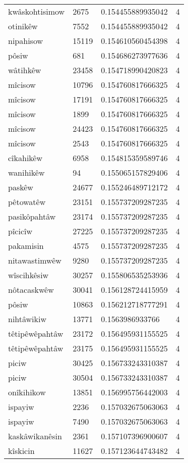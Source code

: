 \begin{longtable}{llll}
kwâskohtisimow & 2675 & 0.154455889935042 & 4 \\
otinikêw & 7552 & 0.154455889935042 & 4 \\
nipahisow & 15119 & 0.154610560454398 & 4 \\
pôsiw & 681 & 0.154686273977636 & 4 \\
wâtihkêw & 23458 & 0.154718990420823 & 4 \\
mîcisow & 10796 & 0.154760817666325 & 4 \\
mîcisow & 17191 & 0.154760817666325 & 4 \\
mîcisow & 1899 & 0.154760817666325 & 4 \\
mîcisow & 24423 & 0.154760817666325 & 4 \\
mîcisow & 2543 & 0.154760817666325 & 4 \\
cîkahikêw & 6958 & 0.154815359589746 & 4 \\
wanihikêw & 94 & 0.155065157829406 & 4 \\
paskêw & 24677 & 0.155246489712172 & 4 \\
pêtowatêw & 23151 & 0.155737209287235 & 4 \\
pasikôpahtâw & 23174 & 0.155737209287235 & 4 \\
pîcicîw & 27225 & 0.155737209287235 & 4 \\
pakamisin & 4575 & 0.155737209287235 & 4 \\
nitawastimwêw & 9280 & 0.155737209287235 & 4 \\
wîscihkêsiw & 30257 & 0.155806535253936 & 4 \\
nôtacaskwêw & 30041 & 0.156128724415959 & 4 \\
pôsiw & 10863 & 0.156212718777291 & 4 \\
nihtâwikiw & 13771 & 0.1563986933766 & 4 \\
têtipêwêpahtâw & 23172 & 0.156495931155525 & 4 \\
têtipêwêpahtâw & 23175 & 0.156495931155525 & 4 \\
piciw & 30425 & 0.156733243310387 & 4 \\
piciw & 30504 & 0.156733243310387 & 4 \\
onîkihikow & 13851 & 0.156995756442003 & 4 \\
ispayiw & 2236 & 0.157032675063063 & 4 \\
ispayiw & 7490 & 0.157032675063063 & 4 \\
kaskâwikanêsin & 2361 & 0.157107396900607 & 4 \\
kîskicin & 11627 & 0.157123644743482 & 4 \\

\end{longtable}

